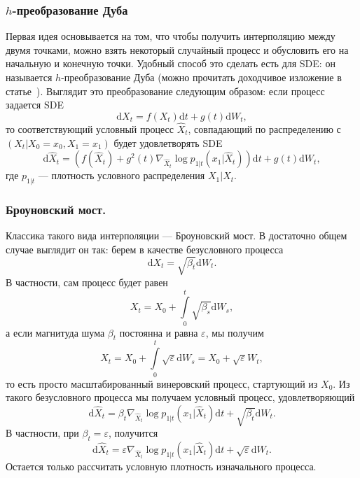 \documentclass[12pt]{article}
\theoremstyle{definition}
\begin{document}
\subsubsection{$h$-преобразование Дуба}
Первая идея основывается на том, что чтобы получить интерполяцию между двумя точками, можно взять некоторый случайный процесс и обусловить его на начальную и конечную точки. Удобный способ это сделать есть для SDE: он называется $h$-преобразование Дуба (можно прочитать доходчивое изложение в статье~\cite{somnath2023aligned}). Выглядит это преобразование следующим образом: если процесс задается SDE
\[
    \mathrm{d} X_t = f(X_t) \mathrm{d} t + g(t) \mathrm{d} W_t,
\]
то соответствующий условный процесс $\hat{X}_t$, совпадающий по распределению с $(X_t | X_0 = x_0, X_1 = x_1)$ будет удовлетворять SDE
\[
    \mathrm{d} \hat{X}_t = \left(f(\hat{X}_t) + g^2(t) \nabla_{\hat{X}_t} \log p_{1 | t}(x_1 | \hat{X}_t)\right)\mathrm{d} t + g(t) \mathrm{d} W_t,
\]
где $p_{1 | t}$ --- плотность условного распределения $X_1 | X_t$.

\subsubsection{Броуновский мост.}
Классика такого вида интерполяции --- Броуновский мост. В достаточно общем случае выглядит он так: берем в качестве безусловного процесса 
\[
    \mathrm{d} X_t = \sqrt{\beta_t} \mathrm{d} W_t.
\]
В частности, сам процесс будет равен
\[
    X_t = X_0 + \int\limits_{0}^{t} \sqrt{\beta_s}\mathrm{d} W_s,
\]
а если магнитуда шума $\beta_t$ постоянна и равна $\varepsilon$, мы получим
\[
    X_t = X_0 + \int\limits_{0}^{t} \sqrt{\varepsilon}\mathrm{d} W_s = X_0 + \sqrt{\varepsilon} W_t,
\]
то есть просто масштабированный винеровский процесс, стартующий из $X_0$.
Из такого безусловного процесса мы получаем условный процесс, удовлетворяющий
\[
    \mathrm{d} \hat{X}_t = \beta_t \nabla_{\hat{X}_t} \log p_{1|t}(x_1 | \hat{X}_t) \mathrm{d} t + \sqrt{\beta_t}\mathrm{d} W_t.
\]
В частности, при $\beta_t = \varepsilon$, получится
\[
    \mathrm{d} \hat{X}_t = \varepsilon \nabla_{\hat{X}_t} \log p_{1|t}(x_1 | \hat{X}_t) \mathrm{d} t + \sqrt{\varepsilon}\mathrm{d} W_t.
\]
Остается только рассчитать условную плотность изначального процесса. \\
\end{document}
